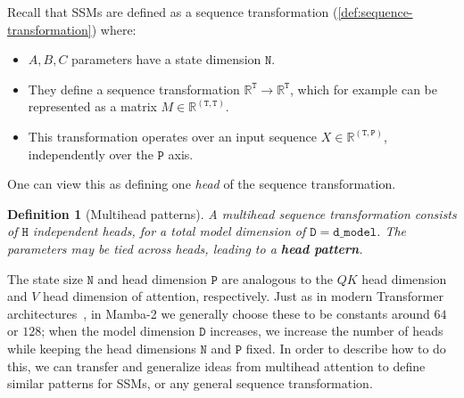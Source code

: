 \documentclass{article}
\newcommand{\citep}{\parencite}
\newtheorem{definition}[theorem]{Definition}
\newcommand{\R}{\mathbb{R}}
\begin{document}
Recall that SSMs are defined as a sequence transformation (\cref{def:sequence-transformation})
where:
\begin{itemize}
  \item $A, B, C$ parameters have a state dimension $\mathtt{N}$.
  \item They define a sequence transformation $\R^\mathtt{T} \to \R^\mathtt{T}$, which for example can be represented as a matrix $M \in \R^{\mathtt{(T, T)}}$.
  \item This transformation operates over an input sequence $X \in \R^{\mathtt{(T, P)}}$, independently over the $\mathtt{P}$ axis.
\end{itemize}
One can view this as defining one \emph{head} of the sequence transformation.
\begin{definition}[Multihead patterns]
  \label{def:head-pattern}
  A multihead sequence transformation consists of $\mathtt{H}$ independent heads, for a total model dimension of $\mathtt{D}=\mathtt{d\_model}$.
  The parameters may be tied across heads, leading to a \textbf{head pattern}.
\end{definition}
The state size $\mathtt{N}$ and head dimension $\mathtt{P}$ are analogous to the $QK$ head dimension and $V$ head dimension of attention, respectively.
Just as in modern Transformer architectures~\citep{chowdhery2022palm,touvron2023llama},
in Mamba-2 we generally choose these to be constants around $64$ or $128$; when the model dimension $\mathtt{D}$ increases, we increase the number of heads while keeping the head dimensions $\mathtt{N}$ and $\mathtt{P}$ fixed.
In order to describe how to do this,
we can transfer and generalize ideas from multihead attention to define similar patterns for SSMs, or any general sequence transformation.
\end{document}
